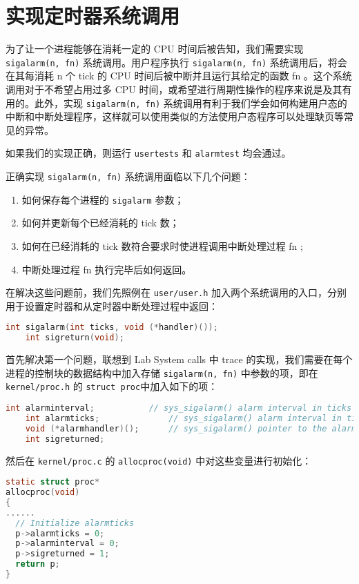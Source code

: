 \section{实现定时器系统调用}

为了让一个进程能够在消耗一定的 CPU 时间后被告知，我们需要实现 \lstinline{sigalarm(n, fn)} 系统调用。用户程序执行 \lstinline{sigalarm(n, fn)} 系统调用后，将会在其每消耗 n 个 tick 的 CPU 时间后被中断并且运行其给定的函数 fn 。这个系统调用对于不希望占用过多 CPU 时间，或希望进行周期性操作的程序来说是及其有用的。此外，实现 \lstinline{sigalarm(n, fn)} 系统调用有利于我们学会如何构建用户态的中断和中断处理程序，这样就可以使用类似的方法使用户态程序可以处理缺页等常见的异常。

如果我们的实现正确，则运行 \lstinline{usertests} 和 \lstinline{alarmtest} 均会通过。

正确实现 \lstinline{sigalarm(n, fn)} 系统调用面临以下几个问题：
\begin{enumerate}
    \item 如何保存每个进程的 \lstinline{sigalarm} 参数；
    \item 如何并更新每个已经消耗的 tick 数；
    \item 如何在已经消耗的 tick 数符合要求时使进程调用中断处理过程 fn ;
    \item 中断处理过程 fn 执行完毕后如何返回。
\end{enumerate}

在解决这些问题前，我们先照例在 \lstinline{user/user.h} 加入两个系统调用的入口，分别用于设置定时器和从定时器中断处理过程中返回：
\begin{lstlisting}[language=C]
    int sigalarm(int ticks, void (*handler)());
    int sigreturn(void);
\end{lstlisting}

首先解决第一个问题，联想到 Lab System calls 中 trace 的实现，我们需要在每个进程的控制块的数据结构中加入存储 \lstinline{sigalarm(n, fn)} 中参数的项，即在 \lstinline{kernel/proc.h} 的 \lstinline{struct proc}中加入如下的项：
\begin{lstlisting}[language=C]
    int alarminterval;           // sys_sigalarm() alarm interval in ticks
    int alarmticks;              // sys_sigalarm() alarm interval in ticks
    void (*alarmhandler)();      // sys_sigalarm() pointer to the alarm handler
    int sigreturned;
\end{lstlisting}

然后在 \lstinline{kernel/proc.c} 的 \lstinline{allocproc(void)} 中对这些变量进行初始化：
\begin{lstlisting}[language=C]
static struct proc*
allocproc(void)
{
......
  // Initialize alarmticks
  p->alarmticks = 0;
  p->alarminterval = 0;
  p->sigreturned = 1;
  return p;
}
\end{lstlisting}

